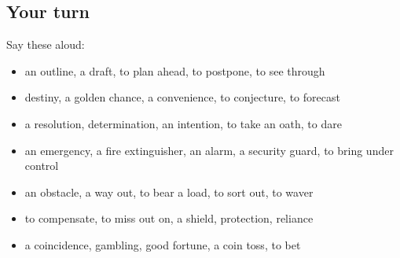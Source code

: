 \subsection*{Your turn}
Say these aloud:

\begin{itemize}
\raggedright
  \item an outline, a draft, to plan ahead, to postpone, to see through
  \item destiny, a golden chance, a convenience, to conjecture, to forecast
  \item a resolution, determination, an intention, to take an oath, to dare
  \item an emergency, a fire extinguisher, an alarm, a security guard, to bring under control
  \item an obstacle, a way out, to bear a load, to sort out, to waver
  \item to compensate, to miss out on, a shield, protection, reliance
  \item a coincidence, gambling, good fortune, a coin toss, to bet
\end{itemize}

